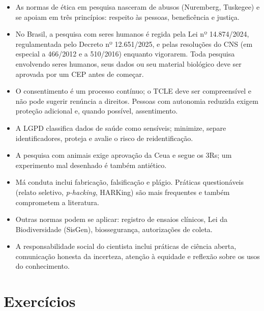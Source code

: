 \documentclass[
]{book}
\providecommand{\tightlist}{%
  \setlength{\itemsep}{0pt}\setlength{\parskip}{0pt}}
\begin{document}
\begin{itemize}
\tightlist
\item
  As normas de ética em pesquisa nasceram de abusos (Nuremberg, Tuskegee) e se apoiam em três princípios: respeito às pessoas, beneficência e justiça.
\item
  No Brasil, a pesquisa com seres humanos é regida pela Lei nº 14.874/2024, regulamentada pelo Decreto nº 12.651/2025, e pelas resoluções do CNS (em especial a 466/2012 e a 510/2016) enquanto vigorarem. Toda pesquisa envolvendo seres humanos, seus dados ou seu material biológico deve ser aprovada por um CEP antes de começar.
\item
  O consentimento é um processo contínuo; o TCLE deve ser compreensível e não pode sugerir renúncia a direitos. Pessoas com autonomia reduzida exigem proteção adicional e, quando possível, assentimento.
\item
  A LGPD classifica dados de saúde como sensíveis; minimize, separe identificadores, proteja e avalie o risco de reidentificação.
\item
  A pesquisa com animais exige aprovação da Ceua e segue os 3Rs; um experimento mal desenhado é também antiético.
\item
  Má conduta inclui fabricação, falsificação e plágio. Práticas questionáveis (relato seletivo, \emph{p-hacking}, HARKing) são mais frequentes e também comprometem a literatura.
\item
  Outras normas podem se aplicar: registro de ensaios clínicos, Lei da Biodiversidade (SisGen), biossegurança, autorizações de coleta.
\item
  A responsabilidade social do cientista inclui práticas de ciência aberta, comunicação honesta da incerteza, atenção à equidade e reflexão sobre os usos do conhecimento.
\end{itemize}

\section{Exercícios}\label{exercuxedcios-7}
\end{document}
